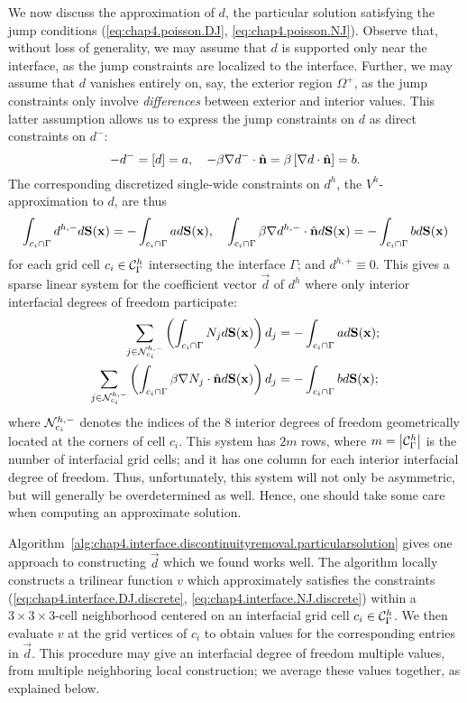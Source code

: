 We now discuss the approximation of $d$, the particular solution satisfying the jump conditions (\ref{eq:chap4.poisson.DJ}, \ref{eq:chap4.poisson.NJ}). Observe that, without loss of generality, we may assume that $d$ is supported only near the interface, as the jump constraints are localized to the interface. Further, we may assume that $d$ vanishes entirely on, say, the exterior region $\Omega^+$, as the jump constraints only involve \emph{differences} between exterior and interior values. This latter assumption allows us to express the jump constraints on $d$ as direct constraints on $d^-$:
\begin{equation*}
-d^- = \left[ d \right] = a, \quad -\beta \nabla d^- \cdot \hat{\mathbf{n}} = \beta \left[ \nabla d \cdot \hat{\mathbf{n}} \right] = b.
\end{equation*}
The corresponding discretized single-wide constraints on $d^h$, the $V^h$-approximation to $d$, are thus
\begin{equation*}
\int_{c_i \cap \Gamma} d^{h,-} d\mathbf{S}(\mathbf{x}) = -\int_{c_i \cap \Gamma} a d\mathbf{S}(\mathbf{x}), \quad
\int_{c_i \cap \Gamma} \beta \nabla d^{h,-} \cdot \hat{\mathbf{n}} d\mathbf{S}(\mathbf{x}) = -\int_{c_i \cap \Gamma} b d\mathbf{S}(\mathbf{x})
\end{equation*}
for each grid cell $c_i \in \mathcal{C}_{\Gamma}^h$ intersecting the interface $\Gamma$; and $d^{h,+} \equiv 0$. This gives a sparse linear system for the coefficient vector $\vec{d}$ of $d^h$ where only interior interfacial degrees of freedom participate:
\begin{align}
\sum_{j \in \mathcal{N}^{h,-}_{c_i}} \left( \int_{c_i \cap \Gamma} N_j d\mathbf{S}(\mathbf{x}) \right) d_j & = -\int_{c_i \cap \Gamma} a d\mathbf{S}(\mathbf{x}); \label{eq:chap4.interface.DJ.discrete} \\
\sum_{j \in \mathcal{N}^{h,-}_{c_i}} \left( \int_{c_i \cap \Gamma} \beta \nabla N_j \cdot \hat{\mathbf{n}} d\mathbf{S}(\mathbf{x}) \right) d_j & = -\int_{c_i \cap \Gamma} b d\mathbf{S}(\mathbf{x}); \label{eq:chap4.interface.NJ.discrete}
\end{align}
where $\mathcal{N}^{h,-}_{c_i}$ denotes the indices of the $8$ interior degrees of freedom geometrically located at the corners of cell $c_i$. This system has $2m$ rows, where $m = \left\lvert \mathcal{C}_{\Gamma}^h \right\rvert$ is the number of interfacial grid cells; and it has one column for each interior interfacial degree of freedom. Thus, unfortunately, this system will not only be asymmetric, but will generally be overdetermined as well. Hence, one should take some care when computing an approximate solution.

Algorithm~\ref{alg:chap4.interface.discontinuityremoval.particularsolution} gives one approach to constructing $\vec{d}$ which we found works well. The algorithm locally constructs a trilinear function $v$ which approximately satisfies the constraints (\ref{eq:chap4.interface.DJ.discrete}, \ref{eq:chap4.interface.NJ.discrete}) within a $3 \times 3 \times 3$-cell neighborhood centered on an interfacial grid cell $c_i \in \mathcal{C}_{\Gamma}^h$. We then evaluate $v$ at the grid vertices of $c_i$ to obtain values for the corresponding entries in $\vec{d}$. This procedure may give an interfacial degree of freedom multiple values, from multiple neighboring local construction; we average these values together, as explained below.

